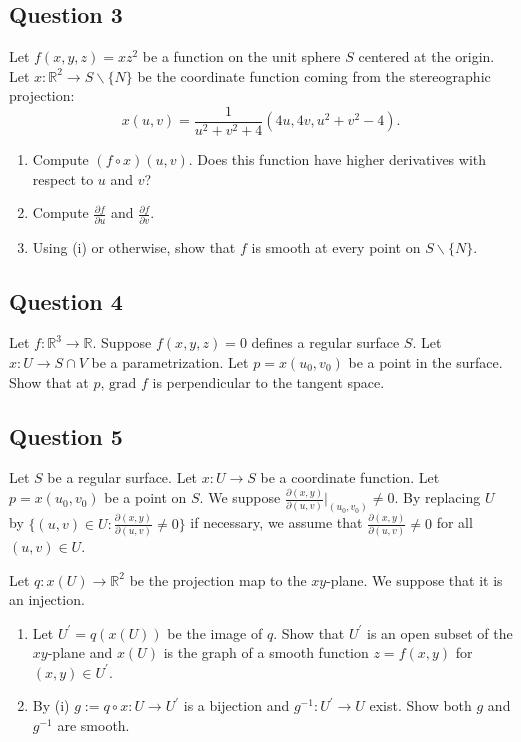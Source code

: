 \documentclass[12pt, a4paper]{article}
\newcommand{\R}{\mathbb{R}}
\begin{document}
\subsection*{Question 3}
Let $f(x,y,z)=xz^{2}$ be a function on the unit sphere $S$ centered at the origin. Let $x:\R^{2}\rightarrow S\backslash\{N\}$ be the coordinate function coming from the stereographic projection:
\[ x(u,v)=\frac{1}{u^{2}+v^{2}+4}(4u,4v,u^{2}+v^{2}-4). \]
\begin{enumerate}[label=(\roman*)]
    \item Compute $(f\circ x)(u,v)$. Does this function have higher derivatives with respect to $u$ and $v$?
    \item Compute $\frac{\partial f}{\partial u}$ and $\frac{\partial f}{\partial v}$.
    \item Using (i) or otherwise, show that $f$ is smooth at every point on $S\backslash\{N\}$.
\end{enumerate}
\newpage

\subsection*{Question 4}
Let $f:\R^{3}\rightarrow\R$. Suppose $f(x,y,z)=0$ defines a regular surface $S$. Let $x:U\rightarrow S\cap V$ be a parametrization. Let $p=x(u_{0},v_{0})$ be a point in the surface. Show that at $p$, $\text{grad } f$ is perpendicular to the tangent space.
\newpage

\subsection*{Question 5}
Let $S$ be a regular surface. Let $x:U\rightarrow S$ be a coordinate function. Let $p=x(u_{0},v_{0})$ be a point on $S$. We suppose $\frac{\partial(x,y)}{\partial(u,v)}|_{(u_{0},v_{0})}\ne0.$ By replacing $U$ by $\{(u,v)\in U:\frac{\partial(x,y)}{\partial(u,v)}\ne0\}$ if necessary, we assume that $\frac{\partial(x,y)}{\partial(u,v)}\ne0$ for all $(u,v)\in U$.

Let $q:x(U)\rightarrow\R^{2}$ be the projection map to the $xy$-plane. We suppose that it is an injection.
\begin{enumerate}[label=(\roman*)]
    \item Let $U^{\prime}=q(x(U))$ be the image of $q$. Show that $U^{\prime}$ is an open subset of the $xy$-plane and $x(U)$ is the graph of a smooth function $z=f(x,y)$ for $(x,y)\in U^{\prime}$.
    \item By (i) $g:=q\circ x:U\rightarrow U^{\prime}$ is a bijection and $g^{-1}:U^{\prime}\rightarrow U$ exist. Show both $g$ and $g^{-1}$ are smooth.
\end{enumerate}
\newpage
\end{document}
